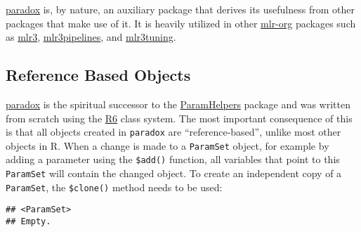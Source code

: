 \documentclass[
]{scrbook}
\newenvironment{Shaded}{\begin{snugshade}}{\end{snugshade}}
\newcommand{\AttributeTok}[1]{\textcolor[rgb]{0.77,0.63,0.00}{#1}}
\newcommand{\CommentTok}[1]{\textcolor[rgb]{0.56,0.35,0.01}{\textit{#1}}}
\newcommand{\ConstantTok}[1]{\textcolor[rgb]{0.00,0.00,0.00}{#1}}
\newcommand{\FunctionTok}[1]{\textcolor[rgb]{0.00,0.00,0.00}{#1}}
\newcommand{\NormalTok}[1]{#1}
\newcommand{\OtherTok}[1]{\textcolor[rgb]{0.56,0.35,0.01}{#1}}
\newcommand{\SpecialCharTok}[1]{\textcolor[rgb]{0.00,0.00,0.00}{#1}}
\newcommand{\StringTok}[1]{\textcolor[rgb]{0.31,0.60,0.02}{#1}}
\renewenvironment{Shaded} {\begin{snugshade}\small} {\end{snugshade}}
\begin{document}
\href{https://paradox.mlr-org.com}{paradox} is, by nature, an auxiliary package that derives its usefulness from other packages that make use of it.
It is heavily utilized in other \href{https://github.com/mlr-org}{mlr-org} packages such as \href{https://mlr3.mlr-org.com}{mlr3}, \href{https://mlr3pipelines.mlr-org.com}{mlr3pipelines}, and \href{https://mlr3tuning.mlr-org.com}{mlr3tuning}.

\hypertarget{reference-based-objects}{%
\subsection{Reference Based Objects}\label{reference-based-objects}}

\href{https://paradox.mlr-org.com}{paradox} is the spiritual successor to the \href{https://cran.r-project.org/package=ParamHelpers}{ParamHelpers} package and was written from scratch using the \href{https://cran.r-project.org/package=R6}{R6} class system.
The most important consequence of this is that all objects created in \texttt{paradox} are ``reference-based'', unlike most other objects in R.
When a change is made to a \texttt{ParamSet} object, for example by adding a parameter using the \texttt{\$add()} function, all variables that point to this \texttt{ParamSet} will contain the changed object.
To create an independent copy of a \texttt{ParamSet}, the \texttt{\$clone()} method needs to be used:

\begin{Shaded}
\end{Shaded}

\begin{verbatim}
## <ParamSet>
## Empty.
\end{verbatim}

\begin{Shaded}
\end{Shaded}
\end{document}
